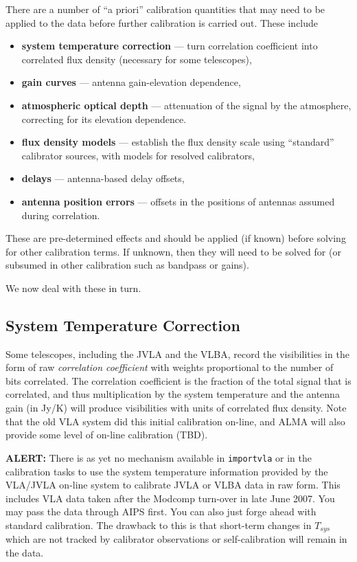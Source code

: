 There are a number of ``a priori'' calibration quantities that
may need to be applied to the data before further calibration
is carried out.  These include
\begin{itemize}
   \item {\bf system temperature correction} --- turn correlation
      coefficient into correlated flux density (necessary for some
      telescopes),
   \item {\bf gain curves} --- antenna gain-elevation dependence,
   \item {\bf atmospheric optical depth} --- attenuation of the signal
      by the atmosphere, correcting for its elevation dependence.
   \item {\bf flux density models} --- establish the flux density
      scale using ``standard'' calibrator sources, with models for
      resolved calibrators,
   \item {\bf delays} --- antenna-based delay offsets,
   \item {\bf antenna position errors} --- offsets in the positions of
      antennas assumed during correlation.
\end{itemize}
These are pre-determined effects and should be applied (if known) before
solving for other calibration terms.  If unknown, then they will
need to be solved for (or subsumed in other calibration such as 
bandpass or gains).

We now deal with these in turn.

\subsection{System Temperature Correction}
\label{section:cal.prior.tsys}

Some telescopes, including the JVLA and the VLBA, record the
visibilities in the form of raw {\it correlation coefficient} 
with weights proportional to the number of bits correlated.
The correlation coefficient is the fraction of the total signal
that is correlated, and thus multiplication by the system temperature
and the antenna gain (in Jy/K) will produce visibilities with
units of correlated flux density.  Note that the old VLA system did
this initial calibration on-line, and ALMA will also provide some
level of on-line calibration (TBD).

{\bf ALERT:} There is as yet no mechanism available in {\tt importvla}
or in the calibration tasks to use the system temperature information
provided by the VLA/JVLA on-line system to calibrate JVLA or VLBA data
in raw form.  This includes VLA data taken after the Modcomp turn-over
in late June 2007.  You may pass the data through AIPS first.  You can
also just forge ahead with standard calibration.  The drawback to this
is that short-term changes in $T_{sys}$ which are not tracked by
calibrator observations or self-calibration will remain in the data.

